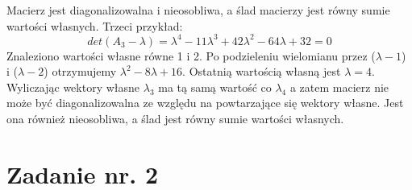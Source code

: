\documentclass{article}
\begin{document}
Macierz jest diagonalizowalna i nieosobliwa, a ślad macierzy jest równy sumie wartości własnych.
Trzeci przykład:
\begin{equation}
  det(A_3 -\lambda) =\lambda^{4}-11\lambda^{3} + 42\lambda^{2}-64\lambda + 32 = 0
\end{equation}
Znaleziono wartości własne równe 1 i 2. Po podzieleniu wielomianu przez ($\lambda-1$) i ($\lambda -2$) otrzymujemy $\lambda^2 -8\lambda+16$. Ostatnią wartością własną jest $\lambda=4$. 
Wyliczając wektory własne $\lambda_3$ ma tą samą wartość co $\lambda_4$ a zatem macierz nie może być diagonalizowalna ze względu na powtarzające się wektory własne. Jest ona również nieosobliwa, a ślad jest równy sumie wartości własnych.
\newpage

\section{Zadanie nr. 2}
\end{document}
